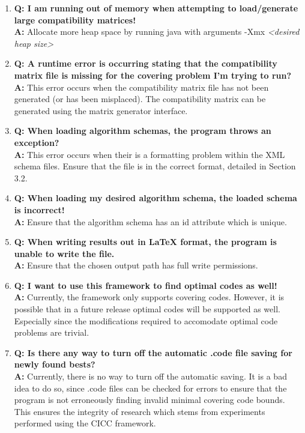 \documentclass[titlepage]{article}
\begin{document}
\begin{enumerate}
\item \textbf{Q: I am running out of memory when attempting to load/generate large compatibility matrices!} \\
\textbf{A:} Allocate more heap space by running java with arguments -Xmx \textit{\textless desired heap size\textgreater}

\item \textbf{Q: A runtime error is occurring stating that the compatibility matrix file is missing for the covering problem I'm trying to run?} \\
\textbf{A:} This error occurs when the compatibility matrix file has not been generated (or has been misplaced). The compatibility matrix can be generated using the matrix generator interface.

\item \textbf{Q: When loading algorithm schemas, the program throws an exception?} \\
\textbf{A:} This error occurs when their is a formatting problem within the XML schema files. Ensure that the file is in the correct format, detailed in Section 3.2.

\item \textbf{Q: When loading my desired algorithm schema, the loaded schema is incorrect!} \\
\textbf{A:} Ensure that the algorithm schema has an id attribute which is unique.

\item \textbf{Q: When writing results out in LaTeX format, the program is unable to write the file.} \\
\textbf{A:} Ensure that the chosen output path has full write permissions.

\item \textbf{Q: I want to use this framework to find optimal codes as well!} \\
\textbf{A:} Currently, the framework only supports covering codes. However, it is possible that in a future release optimal codes will be supported as well. Especially since the modifications required to accomodate optimal code problems are trivial.

\item \textbf{Q: Is there any way to turn off the automatic .code file saving for newly found bests?} \\
\textbf{A:} Currently, there is no way to turn off the automatic saving. It is a bad idea to do so, since .code files can be checked for errors to ensure that the program is not erroneously finding invalid minimal covering code bounds. This ensures the integrity of research which stems from experiments performed using the CICC framework.
\end{enumerate}
\end{document}
